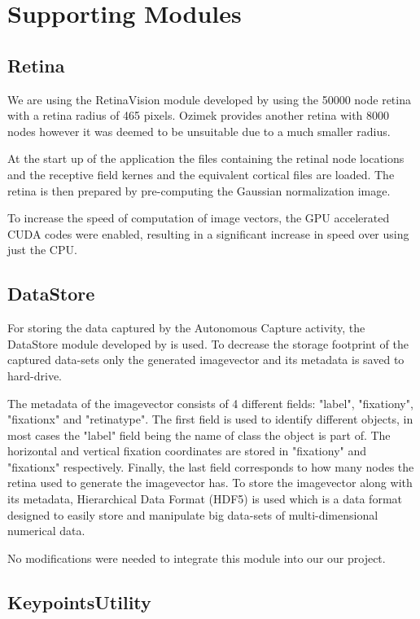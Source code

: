 \documentclass{l4proj}
\begin{document}
\section{Supporting Modules}


\subsection{Retina}
We are using the RetinaVision module developed by \citet{Ozimek} using the 50000 node retina with a retina radius of 465 pixels. Ozimek provides another retina with 8000 nodes however it was deemed to be unsuitable due to a much smaller radius. 

At the start up of the application the files containing the retinal node locations and the receptive field kernes and the equivalent cortical files are loaded. The retina is then prepared by pre-computing the Gaussian normalization image. 

To increase the speed of computation of image vectors, the GPU accelerated CUDA codes were enabled, resulting in a significant increase in speed over using just the CPU. 


\subsection{DataStore}

For storing the data captured by the Autonomous Capture activity, the DataStore module developed by \citet{JianwenZhou} is used. To decrease the storage footprint of the captured data-sets only the generated imagevector and its metadata is saved to hard-drive.

The metadata of the imagevector consists of 4 different fields: "label", "fixationy", "fixationx" and "retinatype". The first field is used to identify different objects, in most cases the "label" field being the name of class the object is part of. The horizontal and vertical fixation coordinates are stored in "fixationy" and "fixationx" respectively. Finally, the last field corresponds to how many nodes the retina used to generate the imagevector has. To store the imagevector along with its metadata, Hierarchical Data Format (HDF5) is used which is a data format designed to easily store and manipulate big data-sets of multi-dimensional numerical data. 

No modifications were needed to integrate this module into our our project. 



\subsection{KeypointsUtility}
\end{document}
